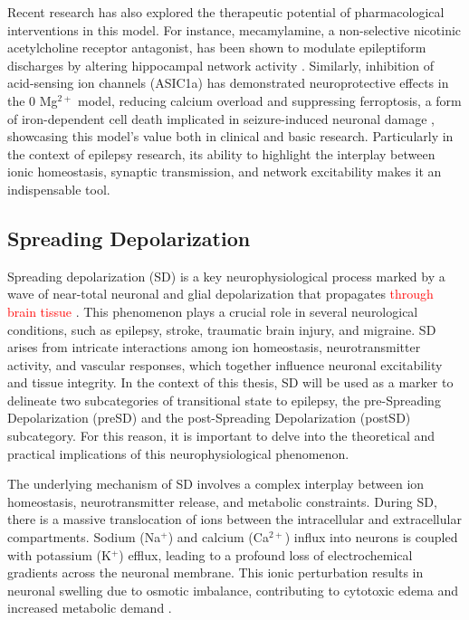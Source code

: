 \documentclass{article}
\begin{document}
Recent research has also explored the therapeutic potential of pharmacological interventions in this model. For instance, mecamylamine, a non-selective nicotinic acetylcholine receptor antagonist, has been shown to modulate epileptiform discharges by altering hippocampal network activity \cite{zapukhliak2021}. Similarly, inhibition of acid-sensing ion channels (ASIC1a) has demonstrated neuroprotective effects in the 0 Mg$^{2+}$ model, reducing calcium overload and suppressing ferroptosis, a form of iron-dependent cell death implicated in seizure-induced neuronal damage \cite{xiaorui2023}, showcasing this model's value both in clinical and basic research. Particularly in the context of epilepsy research, its ability to highlight the interplay between ionic homeostasis, synaptic transmission, and network excitability makes it an indispensable tool.

\subsection{Spreading Depolarization} \label{sec:spreading_depolarization}

Spreading depolarization (SD) is a key neurophysiological process marked by a wave of near-total neuronal and glial depolarization that propagates \textcolor{red}{through brain tissue \cite{aiba2025}}. This phenomenon plays a crucial role in several neurological conditions, such as epilepsy, stroke, traumatic brain injury, and migraine. SD arises from intricate interactions among ion homeostasis, neurotransmitter activity, and vascular responses, which together influence neuronal excitability and tissue integrity. In the context of this thesis, SD will be used as a marker to delineate two subcategories of transitional state to epilepsy, the pre-Spreading Depolarization (preSD) and the post-Spreading Depolarization (postSD) subcategory. For this reason, it is important to delve into the theoretical and practical implications of this neurophysiological phenomenon.

The underlying mechanism of SD involves a complex interplay between ion homeostasis, neurotransmitter release, and metabolic constraints. During SD, there is a massive translocation of ions between the intracellular and extracellular compartments. Sodium (Na$^+$) and calcium (Ca$^{2+}$) influx into neurons is coupled with potassium (K$^+$) efflux, leading to a profound loss of electrochemical gradients across the neuronal membrane. This ionic perturbation results in neuronal swelling due to osmotic imbalance, contributing to cytotoxic edema and increased metabolic demand \cite{drenckhahn2012}.
\end{document}
